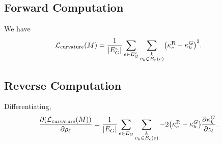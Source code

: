 


\subsection{Forward Computation}
We have \begin{align*}
	\mathcal{L}_{\mathrm{curvature}}\pof{M} &= \frac{1}{\abs{E_G^\epsilon}}\sum_{e \in E_G^\epsilon} \sum_{\substack{k \\ v_k \in B_r\pof{e}}} \pof{\kappa_e^{\text{R}} - \kappa^{\text{G}}_k}^2.
\end{align*}

\subsection{Reverse Computation}
Differentiating, \begin{align*}
	\frac{\partial\pof{\mathcal{L}_{\mathrm{curvature}}\pof{M}}}{\partial\rho_\ell} &= \frac{1}{\abs{E_G}}\sum_{e \in E_G} \sum_{\substack{k \\ v_k \in B_\epsilon\pof{e}}} -2\pof{\kappa_e^{\text{R}} - \kappa^G_k}\frac{\partial\kappa^G_k}{\partial z_\ell}.
\end{align*}
